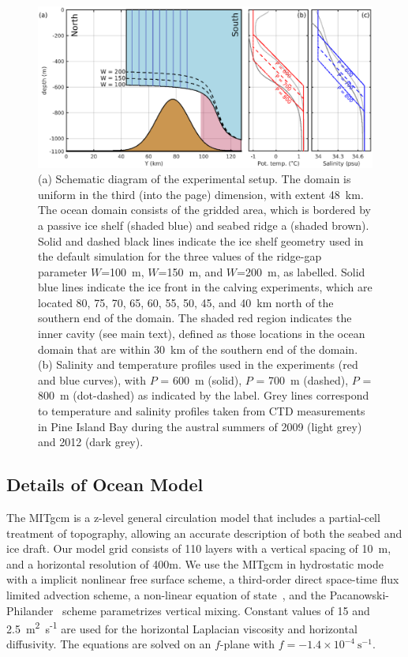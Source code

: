 \documentclass[draft]{agujournal2019}
\begin{document}
\begin{figure}
    \centering
    \includegraphics[width = \textwidth]{../make_figures/plots/figure2.eps}
    \caption{(a) Schematic diagram of the experimental setup. The domain is uniform in the third (into the page) dimension, with extent 48~km. The ocean domain consists of the gridded area, which is bordered by a passive ice shelf (shaded blue) and seabed ridge a (shaded brown). Solid and dashed black lines indicate the ice shelf geometry used in the default simulation for the three values of the ridge-gap parameter $W$=100~m, $W$=150~m, and $W$=200~m, as labelled. Solid blue lines indicate the ice front in the calving experiments, which are located 80, 75, 70, 65, 60, 55, 50, 45, and 40~km north of the southern end of the domain. The shaded red region indicates the inner cavity (see main text), defined as those locations in the ocean domain that are within 30~km of the southern end of the domain. (b) Salinity and temperature profiles used in the experiments (red and blue curves), with $P$ = 600~m (solid), $P$ = 700~m (dashed), $P$ = 800~m (dot-dashed) as indicated by the label. Grey lines correspond to temperature and salinity profiles taken from CTD measurements in Pine Island Bay during the austral summers of 2009 (light grey) and 2012 (dark grey).}
    \label{fig:figure2}
\end{figure}

\subsection{Details of Ocean Model}\label{S:Experiment:Model}
The MITgcm is a z-level general circulation model that includes a partial-cell treatment of topography, allowing an accurate description of both the seabed and ice draft. Our model grid consists of 110 layers with a vertical spacing of 10~m, and a horizontal resolution of 400m. We use the MITgcm in hydrostatic mode with a implicit nonlinear free surface scheme, a third-order direct space-time flux limited advection scheme, a non-linear equation of state~, and the Pacanowski-Philander~\cite{Pacanowski1981JPhysOcean} scheme parametrizes vertical mixing. Constant values of 15 and 2.5~m\textsuperscript{2}~s\textsuperscript{-1} are used for the horizontal Laplacian viscosity and horizontal diffusivity. The equations are solved on an $f$-plane with $f = -1.4\times10^{-4}~\text{s}^{-1}$.
\end{document}
